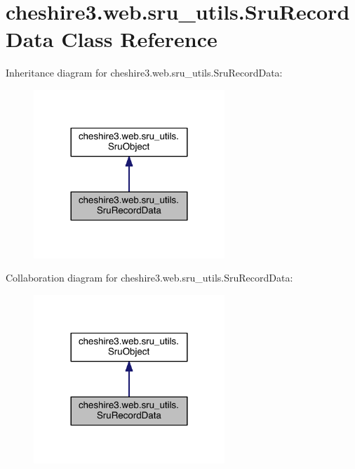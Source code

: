\hypertarget{classcheshire3_1_1web_1_1sru__utils_1_1_sru_record_data}{\section{cheshire3.\-web.\-sru\-\_\-utils.\-Sru\-Record\-Data Class Reference}
\label{classcheshire3_1_1web_1_1sru__utils_1_1_sru_record_data}
}


Inheritance diagram for cheshire3.\-web.\-sru\-\_\-utils.\-Sru\-Record\-Data\-:
\nopagebreak
\begin{figure}[H]
\begin{center}
\leavevmode
\includegraphics[width=204pt]{classcheshire3_1_1web_1_1sru__utils_1_1_sru_record_data__inherit__graph}
\end{center}
\end{figure}


Collaboration diagram for cheshire3.\-web.\-sru\-\_\-utils.\-Sru\-Record\-Data\-:
\nopagebreak
\begin{figure}[H]
\begin{center}
\leavevmode
\includegraphics[width=204pt]{classcheshire3_1_1web_1_1sru__utils_1_1_sru_record_data__coll__graph}
\end{center}
\end{figure}
